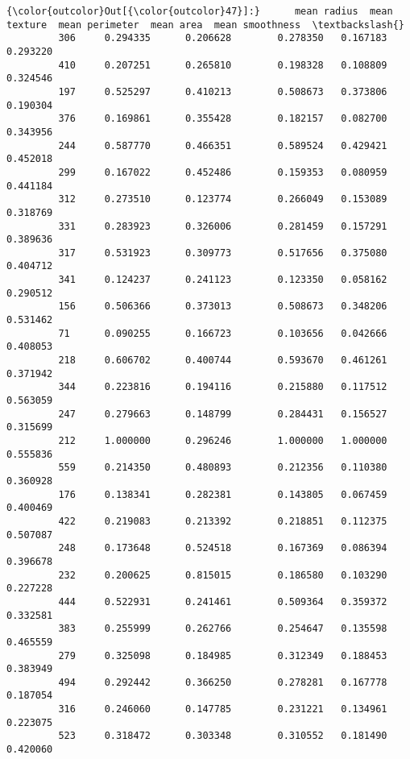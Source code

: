 \documentclass[11pt]{article}
\begin{document}
\begin{Verbatim}[commandchars=\\\{\}]
{\color{outcolor}Out[{\color{outcolor}47}]:}      mean radius  mean texture  mean perimeter  mean area  mean smoothness  \textbackslash{}
         306     0.294335      0.206628        0.278350   0.167183         0.293220   
         410     0.207251      0.265810        0.198328   0.108809         0.324546   
         197     0.525297      0.410213        0.508673   0.373806         0.190304   
         376     0.169861      0.355428        0.182157   0.082700         0.343956   
         244     0.587770      0.466351        0.589524   0.429421         0.452018   
         299     0.167022      0.452486        0.159353   0.080959         0.441184   
         312     0.273510      0.123774        0.266049   0.153089         0.318769   
         331     0.283923      0.326006        0.281459   0.157291         0.389636   
         317     0.531923      0.309773        0.517656   0.375080         0.404712   
         341     0.124237      0.241123        0.123350   0.058162         0.290512   
         156     0.506366      0.373013        0.508673   0.348206         0.531462   
         71      0.090255      0.166723        0.103656   0.042666         0.408053   
         218     0.606702      0.400744        0.593670   0.461261         0.371942   
         344     0.223816      0.194116        0.215880   0.117512         0.563059   
         247     0.279663      0.148799        0.284431   0.156527         0.315699   
         212     1.000000      0.296246        1.000000   1.000000         0.555836   
         559     0.214350      0.480893        0.212356   0.110380         0.360928   
         176     0.138341      0.282381        0.143805   0.067459         0.400469   
         422     0.219083      0.213392        0.218851   0.112375         0.507087   
         248     0.173648      0.524518        0.167369   0.086394         0.396678   
         232     0.200625      0.815015        0.186580   0.103290         0.227228   
         444     0.522931      0.241461        0.509364   0.359372         0.332581   
         383     0.255999      0.262766        0.254647   0.135598         0.465559   
         279     0.325098      0.184985        0.312349   0.188453         0.383949   
         494     0.292442      0.366250        0.278281   0.167778         0.187054   
         316     0.246060      0.147785        0.231221   0.134961         0.223075   
         523     0.318472      0.303348        0.310552   0.181490         0.420060   

\end{Verbatim}
\end{document}
